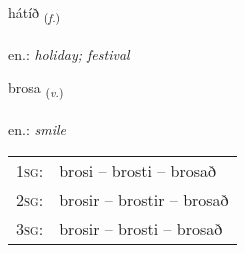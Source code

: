 \documentclass[frontgrid, backgrid]{flacards}\usepackage[]{graphicx}\usepackage[]{xcolor}
\begin{document}
\renewcommand{\flhead}{\vskip5pt \fboxsep=0pt {\small\bfseries\footnotesize Nafnorð | Noun}}
\renewcommand{\fcfoot}{\vskip5pt \fboxsep=0pt \hspace{2pt}{\small\bfseries\footnotesize 2K}}

\renewcommand{\blhead}{\vskip5pt {\small\bfseries\footnotesize Nafnorð | Noun }}
\renewcommand{\bcfoot}{\vskip5pt \hspace{2pt}{\small\bfseries\footnotesize 2K}}


{hátíð \small{\textsubscript{(\textit{f.})}} \\[1ex] %
\textphonetic{[hauːtʰið]} \\
en.: \emph{holiday; festival} \\  [2ex]
\renewcommand*{\arraystretch}{0.8}
}

\renewcommand{\flhead}{\vskip5pt \fboxsep=0pt {\small\bfseries\footnotesize Sagnorð | Verb}}
\renewcommand{\fcfoot}{\vskip5pt \fboxsep=0pt \hspace{2pt}{\small\bfseries\footnotesize 2K}}

\renewcommand{\blhead}{\vskip5pt {\small\bfseries\footnotesize Sagnorð | Verb }}
\renewcommand{\bcfoot}{\vskip5pt \hspace{2pt}{\small\bfseries\footnotesize 2K}}


{brosa \small{\textsubscript{(\textit{v.})}} \\[1ex] %
\textphonetic{[prɔːsa]} \\
en.: \emph{smile} \\  [2ex]
\renewcommand*{\arraystretch}{0.8}
\begin{tabular}{p{1cm}l}
\textsc{1sg}: & brosi -- brosti -- brosað \\ 
\textsc{2sg}: & brosir -- brostir -- brosað \\ 
\textsc{3sg}: & brosir -- brosti -- brosað \\ 
\end{tabular}
}
\end{document}

